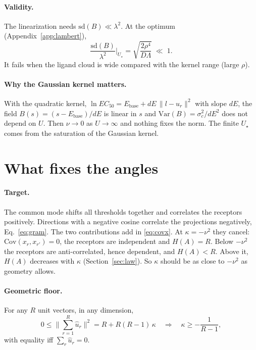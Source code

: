 \documentclass[11pt,a4paper]{article}
\newcommand{\Var}{\mathrm{Var}}
\newcommand{\Cov}{\mathrm{Cov}}
\newcommand{\sd}{\mathrm{sd}}
\newcommand{\Ebase}{E_{\mathrm{base}}}
\newcommand{\uhat}{\hat{u}}
\begin{document}
\paragraph{Validity.} The linearization needs $\sd(B)\ll\lambda^2$. At the optimum
(Appendix~\ref{app:lambert}),
\begin{equation}
  \frac{\sd(B)}{\lambda^2}\bigg|_{U_\star}=\sqrt{\frac{2\rho^4}{D\Lambda}}\;\ll\;1 .
  \label{eq:valid}
\end{equation}
It fails when the ligand cloud is wide compared with the kernel range (large $\rho$).

\paragraph{Why the Gaussian kernel matters.} With the quadratic kernel,
$\ln EC_{50}=\Ebase+dE\,\|l-u_r\|^2$ with slope $dE$, the field $B(s)=(s-\Ebase)/dE$ is
linear in $s$ and $\Var(B)=\sigma_c^2/dE^2$ does not depend on $U$. Then $\nu\to0$ as
$U\to\infty$ and nothing fixes the norm. The finite $U_\star$ comes from the saturation of
the Gaussian kernel.

\section{What fixes the angles}
\label{sec:angle}

\paragraph{Target.} The common mode shifts all thresholds together and correlates the
receptors positively. Directions with a negative cosine correlate the projections
negatively, Eq.~\eqref{eq:gram}. The two contributions add in \eqref{eq:covx}. At
$\kappa=-\nu^2$ they cancel: $\Cov(x_r,x_{r'})=0$, the receptors are independent and
$H(A)=R$. Below $-\nu^2$ the receptors are anti-correlated, hence dependent, and
$H(A)<R$. Above it, $H(A)$ decreases with $\kappa$ (Section~\ref{sec:law}). So $\kappa$
should be as close to $-\nu^2$ as geometry allows.

\paragraph{Geometric floor.} For any $R$ unit vectors, in any dimension,
\begin{equation}
  0\le\Big\|\sum_{r=1}^R\uhat_r\Big\|^2=R+R(R-1)\,\kappa
  \quad\Longrightarrow\quad
  \kappa\ge-\frac{1}{R-1},
  \label{eq:floor}
\end{equation}
with equality iff $\sum_r\uhat_r=0$.
\end{document}
